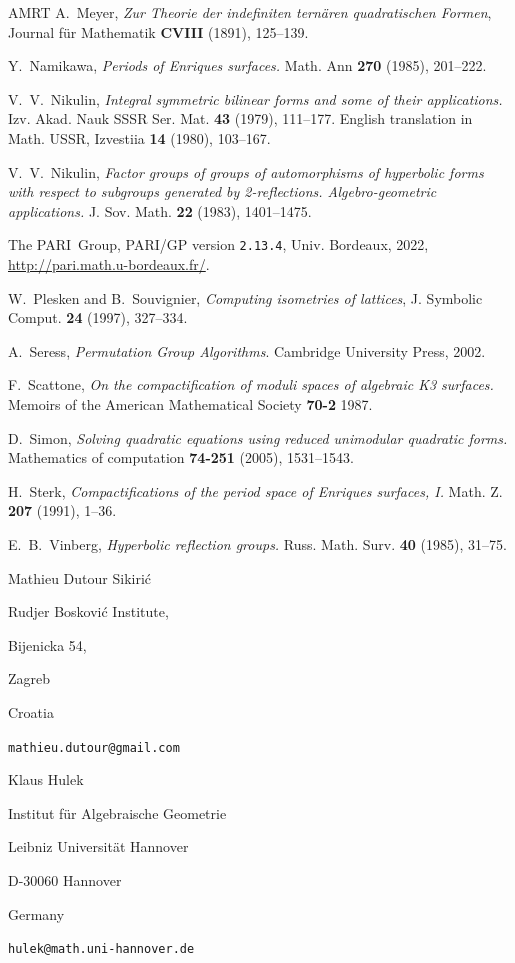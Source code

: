 \documentclass[a4paper,11pt]{article}
\begin{document}
\begin{thebibliography}{AMRT}
A.~Meyer,  {\em Zur Theorie der indefiniten tern\"aren quadratischen Formen}, Journal f\"ur Mathematik {\bf CVIII} (1891), 125--139.

 Y.~Namikawa,  {\it Periods of Enriques surfaces.}
Math. Ann {\bf 270} (1985), 201--222.

 V.~V.~Nikulin, {\it Integral symmetric bilinear forms and some of their applications.}
  Izv. Akad. Nauk SSSR Ser. Mat. {\bf 43} (1979), 111--177.
English translation in Math. USSR,
Izvestiia {\bf 14} (1980), 103--167.

 V.~V.~Nikulin, {\it Factor groups of groups of automorphisms of hyperbolic forms with respect to subgroups generated by 2-reflections. {Algebro}-geometric applications.}
J. Sov. Math. {\bf 22} (1983), 1401--1475.

The PARI~Group, PARI/GP version \texttt{2.13.4}, Univ. Bordeaux, 2022, \url{http://pari.math.u-bordeaux.fr/}.

W.~Plesken and B.~Souvignier, \textit{Computing isometries of lattices},
J. Symbolic Comput. {\bf 24} (1997), 327--334.

A.~Seress, \textit{Permutation Group Algorithms}. Cambridge University Press, 2002.

F.~Scattone, {\em On the compactification of moduli spaces of algebraic K3 surfaces.}
Memoirs of the American Mathematical Society {\bf 70-2} 1987.

D.~Simon, {\em Solving quadratic equations using reduced unimodular quadratic forms.}
Mathematics of computation {\bf 74-251} (2005), 1531--1543.

 H.~Sterk, {\it Compactifications of the period space of Enriques surfaces, I.}
Math. Z. {\bf 207} (1991), 1--36.

 E.~B.~Vinberg, {\it Hyperbolic reflection groups.}
Russ. Math. Surv. {\bf 40} (1985), 31--75.

\end{thebibliography}

\vspace*{0.7cm}
\noindent
\begin{minipage}{0.5\textwidth}
Mathieu Dutour Sikiri\'c

\noindent
Rudjer Boskovi\'c Institute,

\noindent
Bijenicka 54,

 Zagreb

\noindent
Croatia

\noindent
{\tt mathieu.dutour@gmail.com}
\end{minipage}

\vspace*{0.7cm}
\noindent
\begin{minipage}{0.5\textwidth}
Klaus Hulek

\noindent
Institut f\"ur Algebraische Geometrie

\noindent
Leibniz Universit\"at Hannover

\noindent
D-30060 Hannover

\noindent
Germany

\noindent
{\tt hulek@math.uni-hannover.de}
\end{minipage}
\hfill
\end{document}
